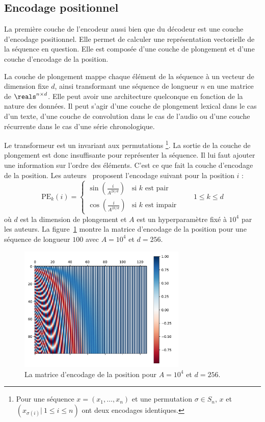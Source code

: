 \subsection{Encodage positionnel}

La première couche de l'encodeur aussi bien que du décodeur est une couche d'encodage positionnel.
Elle permet de calculer une représentation vectorielle de la séquence en question.
Elle est composée d'une couche de plongement et d'une couche d'encodage de la position.

La couche de plongement mappe chaque élément de la séquence à un vecteur de dimension fixe \(d\),
ainsi transformant une séquence de longueur \(n\) en une matrice de \(\reals^{n \times d}\).
Elle peut avoir une architecture quelconque en fonction de la nature des données.
Il peut s'agir d'une couche de plongement lexical dans le cas d'un texte, 
d'une couche de convolution dans le cas de l'audio 
ou d'une couche récurrente dans le cas d'une série chronologique.

Le transformeur est un invariant aux permutations%
\footnote{%
    Pour une séquence \(x = (x_1, \ldots, x_n)\) et une permutation \(\sigma\in S_n\),
    \(x\) et \(\left(x_{\sigma(i)}|\ 1 \le i \le n\right)\) ont deux encodages identiques.
}.
La sortie de la couche de plongement est donc insuffisante pour représenter la séquence.
Il lui faut ajouter une information sur l'ordre des éléments.
C'est ce que fait la couche d'encodage de la position.
Les auteurs~\cite{attention} proposent l'encodage suivant pour la position \(i\) :
\begin{equation}
    \label{eq.sine-positional-encoding}
    \mathrm{PE}_{k}(i) = 
    \begin{cases}
        \sin\left(\frac{i}{A^{2k/d}}\right) & \text{si } k \text{ est pair} \\
        \cos\left(\frac{i}{A^{2k/d}}\right) & \text{si } k \text{ est impair}
    \end{cases} \qquad 1 \le k \le d
\end{equation}
où \(d\) est la dimension de plongement et \(A\) est un hyperparamètre fixé à \(10^4\) par les auteurs.
La figure~\ref{fig.positional-encoding} montre la matrice d'encodage de la position 
pour une séquence de longueur \(100\) avec \(A=10^4\) et \(d=256\).

\begin{figure}[htb]
    \centering
    \includegraphics[width=8cm]{assets/python/positional_embedding.pdf}
    \caption{La matrice d'encodage de la position pour \(A=10^4\) et \(d=256\).}
    \label{fig.positional-encoding}
    
\end{figure}

